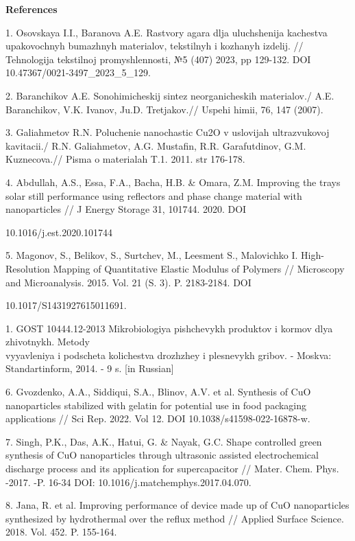 \begin{center}
{\bfseries References}
\end{center}

\begin{noparindent}
1. Osovskaya I.I., Baranova A.E. Rastvory agara dlja uluchshenija
kachestva upakovochnyh bumazhnyh materialov,
tekstil\textquotesingle nyh i kozhanyh izdelij. // Tehnologija
tekstil\textquotesingle\textquotesingle noj promyshlennosti, №5 (407)
2023, pp 129-132. DOI 10.47367/0021-3497\_2023\_5\_129.

2. Baranchikov A.E. Sonohimicheskij sintez neorganicheskih materialov./
A.E. Baranchikov, V.K. Ivanov, Ju.D. Tret\textquotesingle jakov.//
Uspehi himii, 76, 147 (2007).

3. Galiahmetov R.N. Poluchenie nanochastic Cu2O v uslovijah
ul\textquotesingle trazvukovoj kavitacii./ R.N. Galiahmetov, A.G.
Mustafin, R.R. Garafutdinov, G.M. Kuznecova.// Pis\textquotesingle ma
o materialah T.1. 2011. str 176-178.

4. Abdullah, A.S., Essa, F.A., Bacha, H.B. \& Omara, Z.M. Improving the
trays solar still performance using reflectors and phase change
material with nanoparticles // J Energy Storage 31, 101744. 2020. DOI

10.1016/j.est.2020.101744

5. Magonov, S., Belikov, S., Surtchev, M., Leesment S., Malovichko I.
High-Resolution Mapping of Quantitative Elastic Modulus of Polymers //
Microscopy and Microanalysis. 2015. Vol. 21 (S. 3). P. 2183-2184. DOI

10.1017/S1431927615011691.

1. GOST 10444.12-2013 Mikrobiologiya pishchevykh produktov i kormov dlya
zhivotnykh. Metody \\vyyavleniya i podscheta kolichestva drozhzhey i
plesnevykh gribov. - Moskva: Standartinform, 2014. - 9 s. {[}in
Russian{]}

6. Gvozdenko, A.A., Siddiqui, S.A., Blinov, A.V. et al. Synthesis of CuO
nanoparticles stabilized with gelatin for potential use in food
packaging applications // Sci Rep. 2022. Vol 12. DOI
10.1038/s41598-022-16878-w.

7. Singh, P.K., Das, A.K., Hatui, G. \& Nayak, G.C. Shape controlled
green synthesis of CuO nanoparticles through ultrasonic assisted
electrochemical discharge process and its application for
supercapacitor // Mater. Chem. Phys. -2017. -P. 16-34 DOI:
10.1016/j.matchemphys.2017.04.070.

8. Jana, R. et al. Improving performance of device made up of CuO
nanoparticles synthesized by hydrothermal over the reflux method //
Applied Surface Science. 2018. Vol. 452. P. 155-164.


\end{noparindent}
